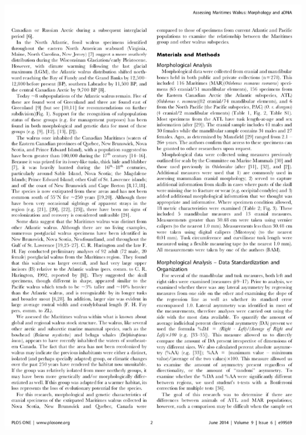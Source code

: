 \documentclass[10pt]{beamer}
\begin{document}
\begin{frame}
\begin{columns}
		\begin{column}{0.5\textwidth}
			\begin{center}
				\includegraphics[width=1.0\textwidth]{figures/paper2.png}
			\end{center}
		\end{column}
	\end{columns}
\end{frame}
\end{document}
